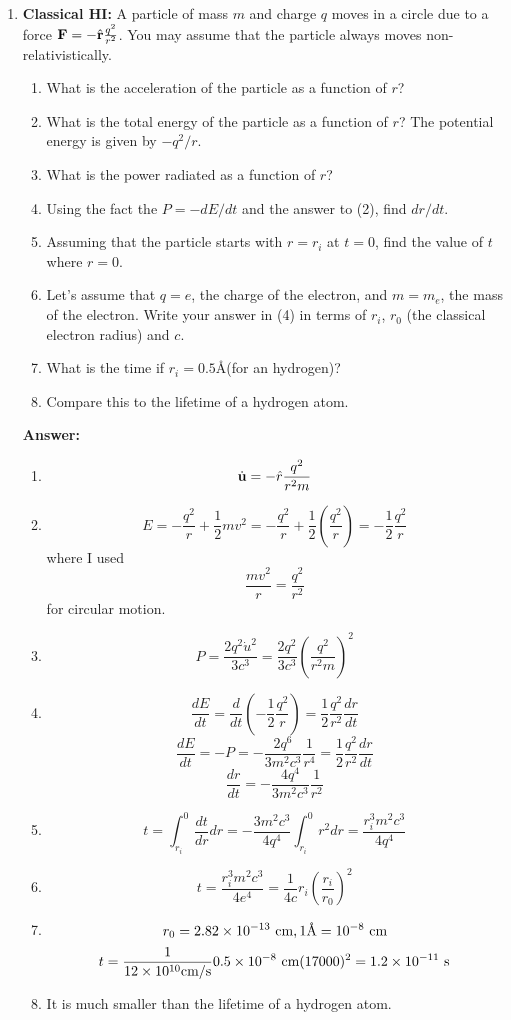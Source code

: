 \documentclass{article}
\begin{document}
\begin{enumerate}
\item{\bf Classical HI:}
A particle of mass $m$ and charge $q$ moves in a circle due to a force 
${\bf F} = -\hat{\bf r} \frac{q^2}{r^2}$.  
You may assume that the particle always moves  non-relativistically.
\begin{enumerate}
\item What is the acceleration of the particle as a function of $r$?
\item What is the total energy of the particle as a function of $r$?
  The potential energy is given by $-q^2/r$.
\item What is the power radiated as a function of $r$?
\item Using the fact the $P=-dE/dt$ and the answer to (2), find
  $dr/dt$. 
\item Assuming that the particle starts with $r=r_i$ at $t=0$, find
  the value of $t$ where $r=0$.   
\item Let's assume that $q=e$, the charge of the electron, and
  $m=m_e$, the mass of the electron.  Write your answer in (4) in
  terms of $r_i$, $r_0$ (the classical electron radius) and $c$.
\item What is the time if $r_i=0.5$\AA (for an hydrogen)?
\item Compare this to the lifetime of a hydrogen atom.
\end{enumerate}

{\bf Answer:}

\begin{enumerate}
\item 
\[ \dot{\bf u} = -{\hat r} \frac{q^2}{r^2 m} \]
\item
\[ E = -\frac{q^2}{r} + \frac{1}{2} m v^2 = -\frac{q^2}{r} + \frac{1}{2} \left ( \frac{q^2}{r} \right ) = -\frac{1}{2} \frac{q^2}{r} \]
where I used
\[ \frac{m v^2}{r} = \frac{q^2}{r^2} \]
for circular motion.
\item 
\[
P = \frac{2 q^2 \dot{u}^2}{3 c^3} = \frac{2 q^2 }{3 c^3} \left ( \frac{q^2}{r^2 m} \right )^2
\]
\item 
\[ 
\frac{d E}{d t} = \frac{d}{dt} \left ( -\frac{1}{2} \frac{q^2}{r} \right ) = \frac{1}{2} \frac{q^2}{r^2} \frac{dr}{dt}
\]
\[
\frac{d E}{d t} = -P =  -\frac{2 q^6 }{3 m^2 c^3} \frac{1}{r^4} =  \frac{1}{2} \frac{q^2}{r^2} \frac{dr}{dt}
\]
\[
 \frac{dr}{dt} =  -\frac{4 q^4 }{3 m^2 c^3} \frac{1}{r^2}
\]
\item
\[
t = \int_{r_i}^0 \frac{dt}{dr} dr = -\frac{3 m^2 c^3}{4 q^4 }\int_{r_i}^0 r^2 d r
=  \frac{ r_i^3 m^2 c^3}{4 q^4 }
\]
\item
\[
t =  \frac{ r_i^3 m^2 c^3}{4 e^4 } = \frac{1}{4 c} r_i \left ( \frac{r_i}{r_0} \right )^2
\]
\item
\[
r_0 = 2.82 \times 10^{-13}~\hbox{\rm cm}, 1\hbox{\rm \AA} = 10^{-8}~\hbox{\rm cm}
\]
\[
t = \frac{1}{12 \times 10^{10} \hbox{\rm cm/s}} 0.5 \times 10^{-8}~\hbox{\rm cm}  ( 17000 )^2 = 1.2 \times 10^{-11}~\hbox{\rm s}
\]
\item
It is much smaller than the lifetime of a hydrogen atom.
\end{enumerate}


\end{enumerate}
\end{document}
